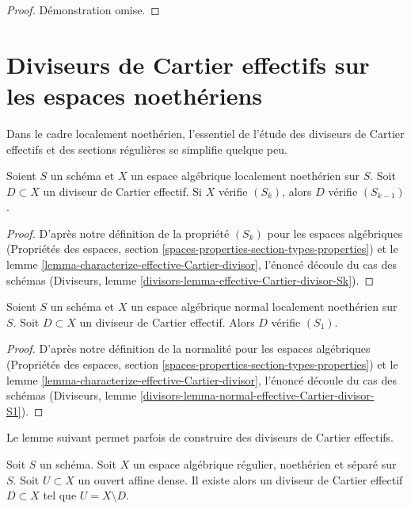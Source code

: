 \begin{proof}
Démonstration omise.
\end{proof}





\section{Diviseurs de Cartier effectifs sur les espaces noethériens}
\label{section-Noetherian-effective-Cartier}

\noindent
Dans le cadre localement noethérien, l'essentiel de l'étude des
diviseurs de Cartier effectifs et des sections régulières se simplifie quelque peu.

\begin{lemma}
\label{lemma-effective-Cartier-divisor-Sk}
Soient $S$ un schéma et $X$ un espace algébrique localement noethérien
sur $S$. Soit $D \subset X$ un diviseur de Cartier effectif. Si $X$ vérifie
$(S_k)$, alors $D$ vérifie $(S_{k - 1})$.
\end{lemma}

\begin{proof}
D'après notre définition de la propriété $(S_k)$ pour les espaces algébriques
(Propriétés des espaces, section
\ref{spaces-properties-section-types-properties})
et le
lemme \ref{lemma-characterize-effective-Cartier-divisor},
l'énoncé découle du cas des schémas
(Diviseurs, lemme \ref{divisors-lemma-effective-Cartier-divisor-Sk}).
\end{proof}

\begin{lemma}
\label{lemma-normal-effective-Cartier-divisor-S1}
Soient $S$ un schéma et $X$ un espace algébrique normal localement noethérien
sur $S$. Soit $D \subset X$ un
diviseur de Cartier effectif. Alors $D$ vérifie $(S_1)$.
\end{lemma}

\begin{proof}
D'après notre définition de la normalité pour les espaces algébriques
(Propriétés des espaces, section
\ref{spaces-properties-section-types-properties})
et le
lemme \ref{lemma-characterize-effective-Cartier-divisor},
l'énoncé découle du cas des schémas
(Diviseurs, lemme \ref{divisors-lemma-normal-effective-Cartier-divisor-S1}).
\end{proof}

\noindent
Le lemme suivant permet parfois de construire des diviseurs de
Cartier effectifs.

\begin{lemma}
\label{lemma-complement-open-affine-effective-cartier-divisor}
Soit $S$ un schéma. Soit $X$ un espace algébrique régulier, noethérien et séparé
sur $S$. Soit $U \subset X$ un ouvert affine dense. Il existe alors un
diviseur de Cartier effectif $D \subset X$ tel que $U = X \setminus D$.
\end{lemma}

